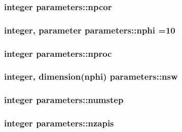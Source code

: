 \hypertarget{classparameters_a7e9a19a3f51eed5371a914ba6dfe80ac}{
\subsubsection[{npcor}]{\setlength{\rightskip}{0pt plus 5cm}integer parameters\-::npcor}}\label{classparameters_a7e9a19a3f51eed5371a914ba6dfe80ac}
\hypertarget{classparameters_afdf22cfea1387cd3b96e7e05639e748e}{
\subsubsection[{nphi}]{\setlength{\rightskip}{0pt plus 5cm}integer, parameter parameters\-::nphi =10}}\label{classparameters_afdf22cfea1387cd3b96e7e05639e748e}
\hypertarget{classparameters_a7f21bebc70eaba4ad593bd189a55867a}{
\subsubsection[{nproc}]{\setlength{\rightskip}{0pt plus 5cm}integer parameters\-::nproc}}\label{classparameters_a7f21bebc70eaba4ad593bd189a55867a}
\hypertarget{classparameters_ac5111fa0cbd2f6dd4958060a0310584a}{
\subsubsection[{nsw}]{\setlength{\rightskip}{0pt plus 5cm}integer, dimension({\bf nphi}) parameters\-::nsw}}\label{classparameters_ac5111fa0cbd2f6dd4958060a0310584a}
\hypertarget{classparameters_a2a213735e1ce341ebcaa199d63b4f372}{
\subsubsection[{numstep}]{\setlength{\rightskip}{0pt plus 5cm}integer parameters\-::numstep}}\label{classparameters_a2a213735e1ce341ebcaa199d63b4f372}
\hypertarget{classparameters_a54bcfb1bc32ebc57cd129b4cfbf5ab15}{
\subsubsection[{nzapis}]{\setlength{\rightskip}{0pt plus 5cm}integer parameters\-::nzapis}}\label{classparameters_a54bcfb1bc32ebc57cd129b4cfbf5ab15}
